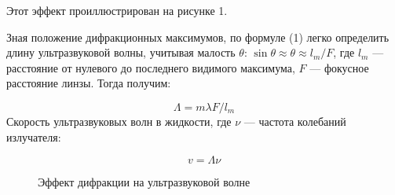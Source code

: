 \documentclass[a4paper,12pt]{article}
\begin{document}
Этот эффект проиллюстрирован на рисунке 1.

	Зная положение дифракционных максимумов, по формуле (1) легко определить длину ультразвуковой волны, учитывая малость $ \theta $: $ \sin \theta \approx \theta \approx l_m /F  $, где $ l_m $ --- расстояние от нулевого до последнего видимого максимума, $ F $ --- фокусное расстояние линзы. Тогда получим:
	
	\begin{equation}\label{}
	 \Lambda = m \lambda F/ l_m 
	\end{equation}
	Скорость ультразвуковых волн в жидкости, где $ \nu $ --- частота колебаний излучателя:
	
\begin{equation}\label{}
	v = \Lambda \nu 
\end{equation}

\begin{figure}[H]
  \caption{Эффект дифракции на ультразвуковой волне}
	\label{fig:image1}
\end{figure}
\end{document}
